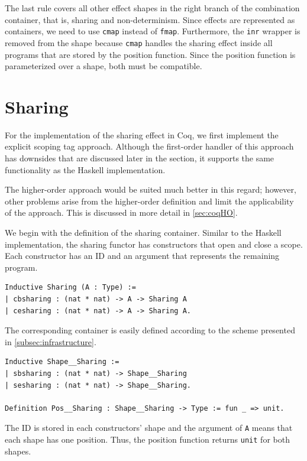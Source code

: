 \documentclass[a4paper, 11pt, fleqn, twoside, abstract=on]{scrreprt}
\newcommand{\cinl}[1]{\texttt{#1}}
\begin{document}
The last rule covers all other effect shapes in the right branch of the combination container, that is, sharing and non-determinism.
Since effects are represented as containers, we need to use \cinl{cmap} instead of \cinl{fmap}.
Furthermore, the \cinl{inr} wrapper is removed from the shape because \cinl{cmap} handles the sharing effect inside all programs that are stored by the position function.
Since the position function is parameterized over a shape, both must be compatible.

\section{Sharing}
\label{sec:lawsOfSharing}
For the implementation of the sharing effect in Coq, we first implement the explicit scoping tag approach.
Although the first-order handler of this approach has downsides that are discussed later in the section, it supports the same functionality as the Haskell implementation.

The higher-order approach would be suited much better in this regard; however, other problems arise from the higher-order definition and limit the applicability of the approach.
This is discussed in more detail in \autoref{sec:coqHO}.

We begin with the definition of the sharing container.
Similar to the Haskell implementation, the sharing functor has constructors that open and close a scope.
Each constructor has an ID and an argument that represents the remaining program.

\begin{verbatim}
Inductive Sharing (A : Type) :=
| cbsharing : (nat * nat) -> A -> Sharing A
| cesharing : (nat * nat) -> A -> Sharing A.
\end{verbatim}

The corresponding container is easily defined according to the scheme presented in \autoref{subsec:infrastructure}.

\begin{verbatim}
Inductive Shape__Sharing :=
| sbsharing : (nat * nat) -> Shape__Sharing
| sesharing : (nat * nat) -> Shape__Sharing.

Definition Pos__Sharing : Shape__Sharing -> Type := fun _ => unit.
\end{verbatim}
\noindent
The ID is stored in each constructors' shape and the argument of \cinl{A} means that each shape has one position.
Thus, the position function returns \cinl{unit} for both shapes.
\end{document}
